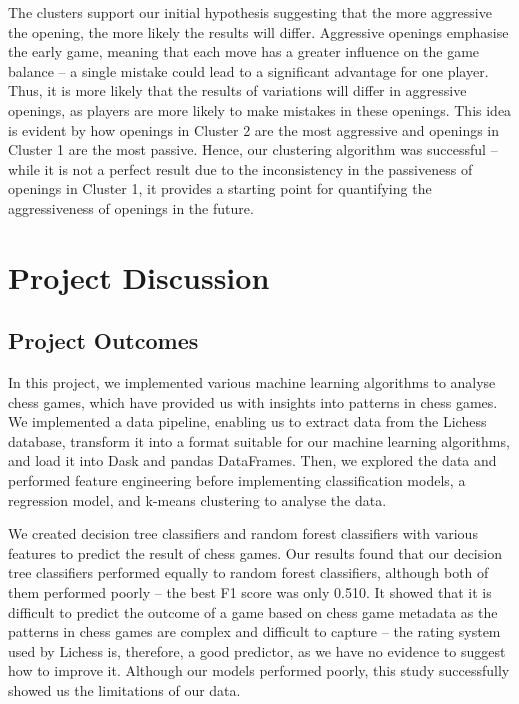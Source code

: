\documentclass[a4paper, 11pt]{article}
\begin{document}
The clusters support our initial hypothesis suggesting that the more aggressive the opening, the more likely the results will differ. Aggressive openings emphasise the early game, meaning that each move has a greater influence on the game balance -- a single mistake could lead to a significant advantage for one player. Thus, it is more likely that the results of variations will differ in aggressive openings, as players are more likely to make mistakes in these openings. This idea is evident by how openings in Cluster 2 are the most aggressive and openings in Cluster 1 are the most passive. Hence, our clustering algorithm was successful -- while it is not a perfect result due to the inconsistency in the passiveness of openings in Cluster 1, it provides a starting point for quantifying the aggressiveness of openings in the future.

\section{Project Discussion}

\subsection{Project Outcomes}
In this project, we implemented various machine learning algorithms to analyse chess games, which have provided us with insights into patterns in chess games. We implemented a data pipeline, enabling us to extract data from the Lichess database, transform it into a format suitable for our machine learning algorithms, and load it into Dask and pandas DataFrames. Then, we explored the data and performed feature engineering before implementing classification models, a regression model, and k-means clustering to analyse the data.

We created decision tree classifiers and random forest classifiers with various features to predict the result of chess games. Our results found that our decision tree classifiers performed equally to random forest classifiers, although both of them performed poorly -- the best F1 score was only 0.510. It showed that it is difficult to predict the outcome of a game based on chess game metadata as the patterns in chess games are complex and difficult to capture -- the rating system used by Lichess is, therefore, a good predictor, as we have no evidence to suggest how to improve it. Although our models performed poorly, this study successfully showed us the limitations of our data.
\end{document}
